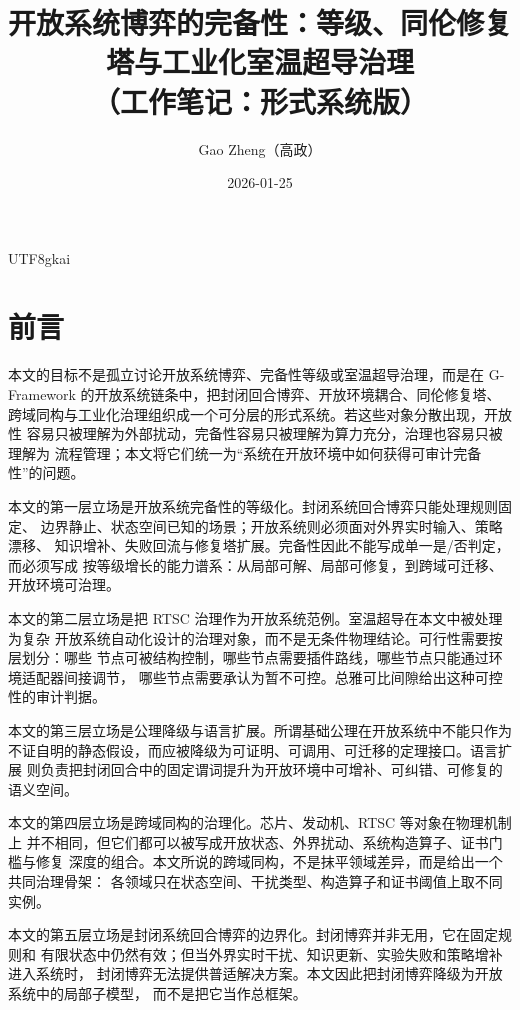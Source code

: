 \documentclass[12pt]{article}
\begin{document}
\begin{CJK*}{UTF8}{gkai}

\title{开放系统博弈的完备性：等级、同伦修复塔与工业化室温超导治理\\（工作笔记：形式系统版）}
\author{Gao Zheng（高政）}
\date{2026-01-25}
\maketitle

\section*{前言}

本文的目标不是孤立讨论开放系统博弈、完备性等级或室温超导治理，而是在
G-Framework 的开放系统链条中，把封闭回合博弈、开放环境耦合、同伦修复塔、
跨域同构与工业化治理组织成一个可分层的形式系统。若这些对象分散出现，开放性
容易只被理解为外部扰动，完备性容易只被理解为算力充分，治理也容易只被理解为
流程管理；本文将它们统一为“系统在开放环境中如何获得可审计完备性”的问题。

本文的第一层立场是开放系统完备性的等级化。封闭系统回合博弈只能处理规则固定、
边界静止、状态空间已知的场景；开放系统则必须面对外界实时输入、策略漂移、
知识增补、失败回流与修复塔扩展。完备性因此不能写成单一是/否判定，而必须写成
按等级增长的能力谱系：从局部可解、局部可修复，到跨域可迁移、开放环境可治理。

本文的第二层立场是把 RTSC 治理作为开放系统范例。室温超导在本文中被处理为复杂
开放系统自动化设计的治理对象，而不是无条件物理结论。可行性需要按层划分：哪些
节点可被结构控制，哪些节点需要插件路线，哪些节点只能通过环境适配器间接调节，
哪些节点需要承认为暂不可控。总雅可比间隙给出这种可控性的审计判据。

本文的第三层立场是公理降级与语言扩展。所谓基础公理在开放系统中不能只作为
不证自明的静态假设，而应被降级为可证明、可调用、可迁移的定理接口。语言扩展
则负责把封闭回合中的固定谓词提升为开放环境中可增补、可纠错、可修复的语义空间。

本文的第四层立场是跨域同构的治理化。芯片、发动机、RTSC 等对象在物理机制上
并不相同，但它们都可以被写成开放状态、外界扰动、系统构造算子、证书门槛与修复
深度的组合。本文所说的跨域同构，不是抹平领域差异，而是给出一个共同治理骨架：
各领域只在状态空间、干扰类型、构造算子和证书阈值上取不同实例。

本文的第五层立场是封闭系统回合博弈的边界化。封闭博弈并非无用，它在固定规则和
有限状态中仍然有效；但当外界实时干扰、知识更新、实验失败和策略增补进入系统时，
封闭博弈无法提供普适解决方案。本文因此把封闭博弈降级为开放系统中的局部子模型，
而不是把它当作总框架。


\end{CJK*}
\end{document}
